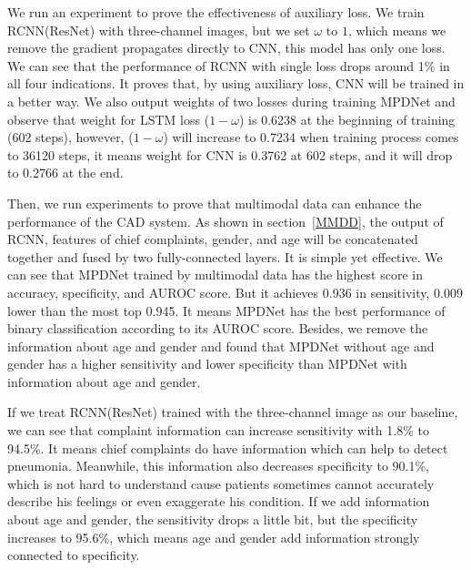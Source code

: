 \documentclass[journal]{IEEEtran}
\begin{document}
We run an experiment to prove the effectiveness of auxiliary loss. We train RCNN(ResNet) with three-channel images, but we set $\omega$ to $1$, which means we remove the gradient propagates directly to CNN, this model has only one loss. We can see that the performance of RCNN with single loss drops around 1\% in all four indications. It proves that, by using auxiliary loss, CNN will be trained in a better way. We also output weights of two losses during training MPDNet and observe that weight for LSTM loss ($1 - \omega$) is 0.6238 at the beginning of training (602 steps), however, ($1 - \omega$) will increase to 0.7234 when training process comes to 36120 steps, it means weight for CNN is 0.3762 at 602 steps, and it will drop to 0.2766 at the end. 

Then, we run experiments to prove that multimodal data can enhance the performance of the CAD system. As shown in section~\ref{MMDD}, the output of RCNN, features of chief complaints, gender, and age will be concatenated together and fused by two fully-connected layers. It is simple yet effective. We can see that MPDNet trained by multimodal data has the highest score in accuracy, specificity, and AUROC score. But it achieves 0.936 in sensitivity, 0.009 lower than the most top 0.945. It means MPDNet has the best performance of binary classification according to its AUROC score. 
Besides, we remove the information about age and gender and found that MPDNet without age and gender has a higher sensitivity and lower specificity than MPDNet with information about age and gender. 
    
If we treat RCNN(ResNet) trained with the three-channel image as our baseline, we can see that complaint information can increase sensitivity with 1.8\% to 94.5\%. It means chief complaints do have information which can help to detect pneumonia. Meanwhile, this information also decreases specificity to 90.1\%, which is not hard to understand cause patients sometimes cannot accurately describe his feelings or even exaggerate his condition. If we add information about age and gender, the sensitivity drops a little bit, but the specificity increases to 95.6\%, which means age and gender add information strongly connected to specificity.
\end{document}
